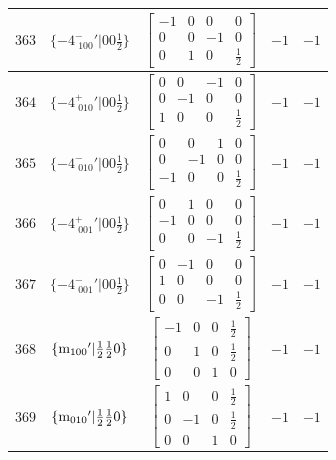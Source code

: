\documentclass[fleqn,8pt]{jsarticle}
\begin{document}
\begin{longtable}{ccccc}
$ 363 $ & $ \{-4^{-}_{\,\,100}{}'|0 0 \frac{1}{2}\} $ & $ \begin{bmatrix} -1 & 0 & 0 & 0 \\ 0 & 0 & -1 & 0 \\ 0 & 1 & 0 & \frac{1}{2} \end{bmatrix} $ & $ -1 $ & $ -1 $ \\ \hline
$ 364 $ & $ \{-4^{+}_{\,\,010}{}'|0 0 \frac{1}{2}\} $ & $ \begin{bmatrix} 0 & 0 & -1 & 0 \\ 0 & -1 & 0 & 0 \\ 1 & 0 & 0 & \frac{1}{2} \end{bmatrix} $ & $ -1 $ & $ -1 $ \\ \hline
$ 365 $ & $ \{-4^{-}_{\,\,010}{}'|0 0 \frac{1}{2}\} $ & $ \begin{bmatrix} 0 & 0 & 1 & 0 \\ 0 & -1 & 0 & 0 \\ -1 & 0 & 0 & \frac{1}{2} \end{bmatrix} $ & $ -1 $ & $ -1 $ \\ \hline
$ 366 $ & $ \{-4^{+}_{\,\,001}{}'|0 0 \frac{1}{2}\} $ & $ \begin{bmatrix} 0 & 1 & 0 & 0 \\ -1 & 0 & 0 & 0 \\ 0 & 0 & -1 & \frac{1}{2} \end{bmatrix} $ & $ -1 $ & $ -1 $ \\ \hline
$ 367 $ & $ \{-4^{-}_{\,\,001}{}'|0 0 \frac{1}{2}\} $ & $ \begin{bmatrix} 0 & -1 & 0 & 0 \\ 1 & 0 & 0 & 0 \\ 0 & 0 & -1 & \frac{1}{2} \end{bmatrix} $ & $ -1 $ & $ -1 $ \\ \hline
$ 368 $ & $ \{{\rm m}_{100}{}'|\frac{1}{2} \frac{1}{2} 0\} $ & $ \begin{bmatrix} -1 & 0 & 0 & \frac{1}{2} \\ 0 & 1 & 0 & \frac{1}{2} \\ 0 & 0 & 1 & 0 \end{bmatrix} $ & $ -1 $ & $ -1 $ \\ \hline
$ 369 $ & $ \{{\rm m}_{010}{}'|\frac{1}{2} \frac{1}{2} 0\} $ & $ \begin{bmatrix} 1 & 0 & 0 & \frac{1}{2} \\ 0 & -1 & 0 & \frac{1}{2} \\ 0 & 0 & 1 & 0 \end{bmatrix} $ & $ -1 $ & $ -1 $ \\ \hline

\end{longtable}
\end{document}
